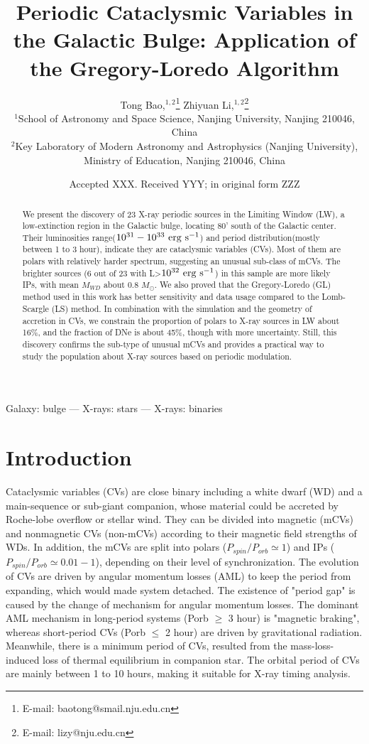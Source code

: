 \documentclass[fleqn,usenatbib]{mnras}
\title[Periodic Cataclysmic Variables in the Galactic Bulge]{Periodic Cataclysmic Variables in the Galactic Bulge: Application of the Gregory-Loredo Algorithm}
\author[Bao \& Li]{
Tong Bao,$^{1,2}$\thanks{E-mail: baotong@smail.nju.edu.cn}
Zhiyuan Li,$^{1,2}$\thanks{E-mail: lizy@nju.edu.cn}
\\
$^{1}$School of Astronomy and Space Science, Nanjing University, Nanjing 210046, China\\
$^{2}$Key Laboratory of Modern Astronomy and Astrophysics (Nanjing University), Ministry of Education, Nanjing 210046, China
}
\date{Accepted XXX. Received YYY; in original form ZZZ}
\begin{document}
\maketitle
\begin{abstract}
We present the discovery of 23 X-ray periodic sources in the Limiting Window (LW), a low-extinction region in the Galactic bulge, locating 80' south of the Galactic center. Their luminosities range(${\rm 10^{31}-10^{33} ~erg ~ s^{-1}}$) and period distribution(mostly between 1 to 3 hour), indicate they are cataclysmic variables (CVs). Most of them are polars with relatively harder spectrum, suggesting an unusual sub-class of mCVs.
The brighter sources (6 out of 23 with L>$\rm 10^{32} ~erg~s^{-1}$) in this sample are more likely IPs, with mean $M_{WD}$ about 0.8 $M_\odot$.
We also proved that the Gregory-Loredo (GL) method used in this work has better sensitivity and data usage compared to the Lomb-Scargle (LS) method. In combination with the simulation and the geometry of accretion in CVs, we constrain the proportion of polars to X-ray sources in LW about 16\%, and the fraction of DNe is about 45\%, though with more uncertainty. Still, this discovery confirms the sub-type of unusual mCVs and provides a practical way to study the population about X-ray sources based on periodic modulation.
\end{abstract}

\begin{keywords}
Galaxy: bulge --- X-rays: stars --- X-rays: binaries
\end{keywords}

\section{Introduction} \label{sec:intro}
Cataclysmic variables (CVs) are close binary including a white dwarf (WD) and a main-sequence or sub-giant companion, whose material could be accreted by Roche-lobe overflow or stellar wind. 
They can be divided into magnetic (mCVs) and nonmagnetic CVs (non-mCVs) according to their magnetic field strengths of WDs. In addition, the mCVs are split into polars ($P_{spin}/P_{orb}\simeq 1$) and IPs ($P_{spin}/P_{orb}\simeq 0.01-1$), depending on their level of synchronization. 
The evolution of CVs are driven by angular momentum losses (AML) to keep the period from expanding, which would made system detached. The existence of  "period gap" is caused by the change of mechanism for angular momentum losses.  The dominant AML mechanism in long-period
systems (Porb $\geq$ 3 hour) is "magnetic braking", whereas short-period CVs (Porb $\leq$ 2 hour) are  driven by gravitational radiation. Meanwhile, there is a minimum period of CVs, resulted from the mass-loss-induced loss of thermal equilibrium in companion star. The orbital period of CVs are mainly between 1 to 10 hours, making it suitable for X-ray timing analysis. 
\end{document}

